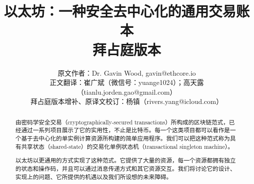 \documentclass[9pt,oneside]{amsart}
\title{以太坊：一种安全去中心化的通用交易账本 \\ {\smaller \textbf{拜占庭版本 \YellowPaperVersionNumber}}}
\author{
    原文作者：Dr. Gavin Wood, gavin@ethcore.io\\
    正文翻译：崔广斌（微信号：yuange1024）；高天露（tianlu.jorden.gao@gmail.com） \\
    拜占庭版本增补、原译文校订：杨镇（rivers.yang@icloud.com）
}
\begin{document}
\pagecolor{pagecolor}

\begin{abstract}
由密码学安全交易（cryptographically-secured transactions）所构成的区块链范式，已经通过一系列项目展示了它的实用性，不止是比特币。每一个这类项目都可以看作是一个基于去中心化的单实例计算资源所构建的简单应用程序。我们可以把这种范式称为具有共享状态（shared-state）的交易化单例状态机（transactional singleton machine）。

以太坊以更通用的方式实现了这种范式。它提供了大量的资源，每一个资源都拥有独立的状态和操作码，并且可以通过消息传递方式和其它资源交互。我们将讨论它的设计、实现上的问题、它所提供的机遇以及我们所设想的未来障碍。
\end{abstract}

\maketitle
\end{document}
